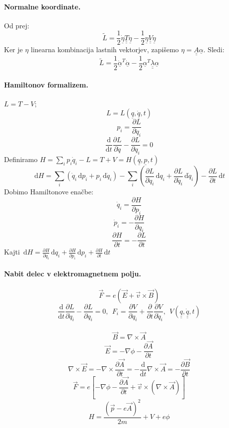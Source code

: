 \documentclass[a4paper]{article}
\newcommand{\vct}[1]{\overrightarrow{#1}}
\newcommand{\dif}{\,\mathrm{d}}
\newcommand{\pd}[2]{\frac{\partial {#1}}{\partial {#2}}}
\newcommand{\dd}[2]{\frac{\mathrm{d} {#1}}{\mathrm{d} {#2}}}
\newcommand{\duline}[1]{\underline{\underline{#1}}}
\begin{document}
\paragraph{Normalne koordinate.} Od prej:
$$\tilde{L} = \frac{1}{2}\dot{\underline{\eta}} \duline{T} \dot{\underline{\eta}} - \frac{1}{2}\underline{\eta} \duline{V} \underline{\eta}$$
Ker je $\eta$ linearna kombinacija lastnih vektorjev, zapišemo $\eta = \duline{A}\underline{\alpha}$. Sledi:
$$\tilde{L} = \frac{1}{2}\dot{\underline{\alpha}}^T\dot{\underline{\alpha}} - \frac{1}{2}\underline{\alpha}^T\duline{\lambda}\underline{\alpha}$$
\paragraph{Hamiltonov formalizem.} $L = T - V$;
$$L = L(\underline{q}, \dot{\underline{q}}, t)$$
$$p_i = \pd{L}{\dot{q}_i}$$
$$\dd{}{t}\pd{L}{\dot{q}} - \pd{L}{q_i} = 0$$
Definiramo $H = \displaystyle{\sum_{i}p_i\dot{q}_i} - L = T + V = H(\underline{q}, \underline{p}, t)$
$$\dif H = \sum_i \left(\dot{q}_i\dif p_i + p_i \dif \dot{q}_i\right) - \sum_i \left(\pd{L}{q_i}\dif q_i + \pd{L}{\dot{q}_i}\dif\dot{q}_i\right) - \pd{L}{t}\dif t$$
Dobimo Hamiltonove enačbe:
$$\dot{q}_i = \pd{H}{p_i}$$
$$\dot{p}_i = -\pd{H}{q_i}$$
$$\pd{H}{t} = -\pd{L}{t}$$
Kajti $\displaystyle{\dif H = \pd{H}{q_i}\dif q_i + \pd{H}{p_i} \dif p_i + \pd{H}{t}\dif t}$
\paragraph{Nabit delec v elektromagnetnem polju.} $$\vct{F} = e(\vct{E} + \vct{v} \times \vct{B})$$
$$\dd{}{t}\pd{L}{\dot{q}_i} - \pd{L}{q_i} = 0,~~F_i = \pd{V}{q_i} + \pd{}{t}\pd{V}{\dot{q}_i},~~V(\duline{q}, \duline{\dot{q}}, t)$$
\\
$$\vct{B} = \nabla\times\vct{A}$$
$$\vct{E} = -\nabla\phi - \pd{\vct{A}}{t}$$
$$\nabla\times\vct{E} = - \nabla\times\pd{\vct{A}}{t} = -\dd{}{t}\nabla\times\vct{A} = - \pd{\vct{B}}{t}$$
$$\vct{F} = e\left[-\nabla\phi - \pd{\vct{A}}{t} + \vct{v}\times(\nabla \times \vct{A})\right]$$
$$H = \frac{(\vct{p} - e\vct{A})^2}{2m} + V + e\phi$$
\end{document}
